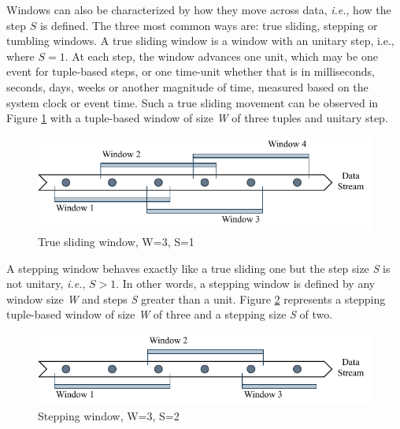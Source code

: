 Windows can also be characterized by how they move across data, \textit{i.e.}, how the step $S$ is defined. The three most common ways are: true sliding, stepping or tumbling windows. A true sliding window is a window with an unitary step, i.e., where $S = 1$. At each step, the window advances one unit, which may be one event for tuple-based steps, or one time-unit whether that is in milliseconds, seconds, days, weeks or another magnitude of time, measured based on the system clock or event time. Such a true sliding movement can be observed in Figure \ref{fig:sliding-window} with a tuple-based window of size \textit{W} of three tuples and unitary step. 

\begin{figure}[!htb]
    \begin{center}
      \includegraphics[scale=1.1]{figures/sliding.pdf}
      \caption[True sliding window]{True sliding window, W=3, S=1}
      \label{fig:sliding-window} 
    \end{center}
\end{figure} 

A stepping window behaves exactly like a true sliding one but the step size \textit{S} is not unitary, \textit{i.e.}, $S > 1$. In other words, a stepping window is defined by any window size \textit{W} and steps \textit{S} greater than a unit. Figure \ref{fig:stepping-window} represents a stepping tuple-based window of size \textit{W} of three and a stepping size \textit{S} of two.

\begin{figure}[!htb]
    \begin{center}
      \includegraphics[scale=1.1]{figures/stepping.pdf}
      \caption[Stepping window]{Stepping window, W=3, S=2}
      \label{fig:stepping-window}
    \end{center}
\end{figure}

